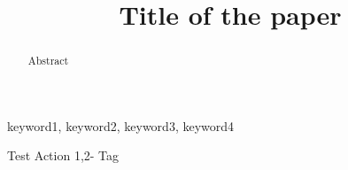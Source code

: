 \documentclass[conference]{IEEEtran}
\begin{document}
\title{Title of the paper
{\footnotesize}
}

\author{
}

\maketitle

\begin{abstract} 
Abstract 
\end{abstract}

\begin{IEEEkeywords}
keyword1, keyword2, keyword3, keyword4
\end{IEEEkeywords}


Test Action 1,2- Tag


\clearpage
\end{document}
